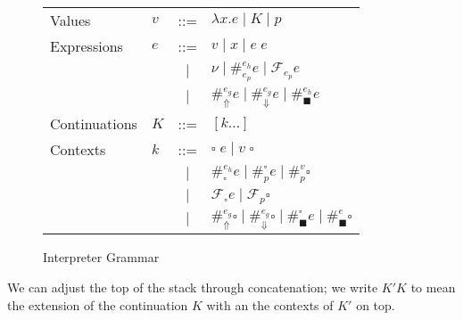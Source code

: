 \documentclass[11pt]{article}
\newcommand\F{\mathcal{F}}
\begin{document}
\begin{figure}[H]
\caption{Interpreter Grammar}
\label{fig:startGrammar}

\begin{tabular}{llcl}
Values & $v$ & ::= & $\lambda x.e \mid K \mid p$ \\
Expressions & $e$ & ::= & $v \mid x \mid e\;e$ \\
& & $|$ & $\nu \mid \#_{e_p}^{e_h}e \mid \F_{e_p}e$ \\
& & $|$ & $\#_\Uparrow^{e_g}e
    \mid   \#_\Downarrow^{e_g}e
    \mid   \#_\blacksquare^{e_h}e$ \\
Continuations & $K$ & ::= & $[k\ldots]$ \\
Contexts & $k$ &
     ::= & $\square\;e
     \mid  v\;\square$ \\
& & $|$ & $\#_\square^{e_h} e
    \mid   \#_p^\square e
    \mid   \#_p^v \square$ \\
& & $|$ & $\F_\square e
    \mid   \F_p \square$ \\
& & $|$ & $\#_\Uparrow^{e_g}\square
    \mid   \#_\Downarrow^{e_g}\square
    \mid   \#_\blacksquare^\square e
    \mid   \#_\blacksquare^e\square$ \\
\end{tabular}
\end{figure}





We can adjust the top of the stack through concatenation; we write $K'K$ to mean the extension of the continuation $K$ with an the contexts of $K'$ on top.
\end{document}
